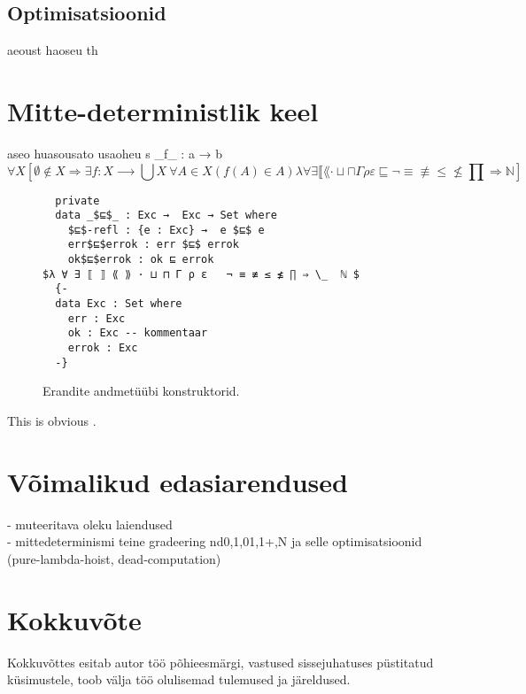 \documentclass[a4paper,12pt]{article}
\begin{document}
\subsection{Optimisatsioonid}
aeoust haoseu th

\clearpage

\section{Mitte-deterministlik keel}
aseo huasousato usaoheu s
_f_ : a → b\[
∀X [ ∅ ∉ X ⇒ ∃f:X ⟶  ⋃ X\ ∀A ∈ X (f(A) ∈ A )λ ∀ ∃ ⟦ ⟪ · ⊔ ⊓ Γ ρ ε  ⊑   ¬ ≡ ≢ ≤ ≰ ∏ ⇒  ℕ ]\]
\begin{figure}
  \begin{lstlisting}
  private
  data _$⊑$_ : Exc →  Exc → Set where
    $⊑$-refl : {e : Exc} →  e $⊑$ e
    err$⊑$errok : err $⊑$ errok
    ok$⊑$errok : ok ⊑ errok
$λ ∀ ∃ ⟦ ⟧ ⟪ ⟫ · ⊔ ⊓ Γ ρ ε   ¬ ≡ ≢ ≤ ≰ ∏ ⇒ \_  ℕ $
  {-
  data Exc : Set where
    err : Exc
    ok : Exc -- kommentaar 
    errok : Exc
  -}
  \end{lstlisting}
  \caption{Erandite andmetüübi konstruktorid.}
\end{figure}

This is obvious \cite{Benton2016}. \cite{Katsumata2014}

\clearpage

\section{Võimalikud edasiarendused}

- muteeritava oleku laiendused\\
- mittedeterminismi teine gradeering nd0,1,01,1+,N ja selle optimisatsioonid (pure-lambda-hoist, dead-computation)

\clearpage

\section{Kokkuvõte}
Kokkuvõttes esitab autor töö põhieesmärgi, vastused sissejuhatuses püstitatud
küsimustele, toob välja töö olulisemad tulemused ja järeldused.

\clearpage

\renewcommand{\baselinestretch}{1.15}
\fontsize{11}{11}\selectfont
\printbibliography[title={\vskip 60pt\centering Kasutatud kirjandus}]
\end{document}
